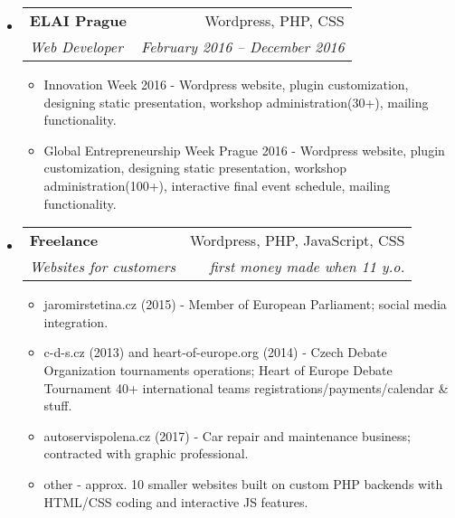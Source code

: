\documentclass[letterpaper,11pt]{article}
\makeatletter
\newcommand{\resumeItem}[2]{
  \item\small{
    \textbf{#1}{: #2 \vspace{-2pt}}
  }
}
\newcommand{\sitem}[1]{\item #1 \vspace{-2pt}}
\newcommand{\resumeSubheading}[4]{
  \vspace{-1pt}\item
    \begin{tabular*}{0.97\textwidth}[t]{l@{\extracolsep{\fill}}r}
      \textbf{#1} & #2 \\
      \textit{\small#3} & \textit{\small #4} \\
    \end{tabular*}\vspace{-5pt}
}
\newcommand{\resumeSubSubheading}[2]{
    \begin{tabular*}{0.97\textwidth}{l@{\extracolsep{\fill}}r}
      \textit{\small#1} & \textit{\small #2} \\
    \end{tabular*}\vspace{-5pt}
}
\newenvironment{subheadingListing}{\begin{itemize}[leftmargin=*]}{\end{itemize}}
\newenvironment{resumeList}{\begin{itemize}}{\end{itemize}\vspace{-5pt}}
\newcommand{\CC}{C\nolinebreak\hspace{-.05em}\raisebox{.4ex}{\tiny\bf +}\nolinebreak\hspace{-.10em}\raisebox{.4ex}{\tiny\bf +}}
\makeatother
\begin{document}
\begin{subheadingListing}
  \resumeSubheading
  {ELAI Prague}{Wordpress, PHP, CSS}
  {Web Developer}{February 2016 – December 2016}
  \begin{resumeList}
    \sitem{Innovation Week 2016 - Wordpress website, plugin customization, designing static presentation, workshop administration(30+), mailing functionality.}
    \sitem{Global Entrepreneurship Week Prague 2016 - Wordpress website, plugin customization, designing static presentation, workshop administration(100+), interactive final event schedule, mailing functionality.}
  \end{resumeList}

  \resumeSubheading
  {Freelance}{Wordpress, PHP, JavaScript, CSS}
  {Websites for customers}{first money made when 11 y.o.}
  \begin{resumeList}
    \sitem{jaromirstetina.cz (2015) - Member of European Parliament; social media integration.}
    \sitem{c-d-s.cz (2013) and heart-of-europe.org (2014) - Czech Debate Organization tournaments operations; Heart of Europe Debate Tournament 40+ international teams registrations/payments/calendar \& stuff. }
    \sitem{autoservispolena.cz (2017) - Car repair and maintenance business; contracted with graphic professional.}  
    \sitem{other - approx. 10 smaller websites built on custom PHP backends with HTML/CSS coding and interactive JS features.}  
  \end{resumeList}




\end{subheadingListing}
\end{document}
